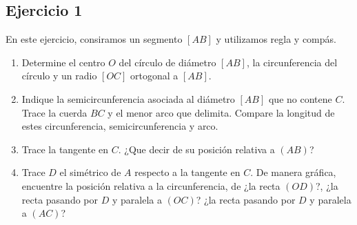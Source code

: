 \begin{center}
\end{center}

\subsection{Ejercicio 1}

En este ejercicio, consiramos un segmento $[AB]$ y utilizamos
regla y compás.

\begin{center}
\end{center}

\begin{enumerate}
\item Determine el centro $O$ del círculo de diámetro $[AB]$, la
circunferencia del círculo y un radio $[OC]$ ortogonal a $[AB]$.

\item Indique la semicircunferencia asociada al diámetro $[AB]$ que no contene
$C$. Trace la cuerda $BC$ y el menor arco que delimita.
Compare la longitud de estes circunferencia, semicircunferencia y arco.

\item Trace la tangente en $C$. ¿Que decir de su posición relativa a $(AB)$?

\item Trace $D$ el simétrico de $A$ respecto a la tangente en $C$.
  De manera gráfica, encuentre la posición relativa a la circunferencia, de
  ¿la recta $(OD)$?, ¿la recta pasando por $D$ y paralela a $(OC)$?
  ¿la recta pasando por $D$ y paralela a $(AC)$?
\end{enumerate}

